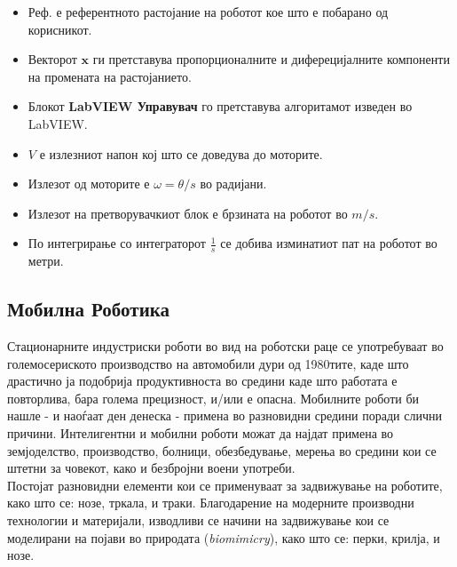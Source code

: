 \documentclass[12pt]{article}
\renewcommand{\vec}[1]{\mathbf{#1}}
\begin{document}
    \begin{itemize}
      \item Реф. е референтното растојание на роботот кое што е побарано од корисникот.
      \item Векторот $\vec{x}$ ги претставува пропорционалните и диферецијалните компоненти на промената на растојанието.
      \item Блокот \textbf{LabVIEW Управувач} го претставува алгоритамот изведен во LabVIEW.
      \item $V$ е излезниот напон кој што се доведува до моторите.
      \item Излезот од моторите е $\omega = \theta/s$ во радијани.
      \item Излезот на претворувачкиот блок е брзината на роботот во $m/s$.
      \item По интегрирање со интеграторот $\frac{1}{s}$ се добива изминатиот пат на роботот во метри.
    \end{itemize}

  \subsection{Мобилна Роботика}
    Стационарните индустриски роботи во вид на роботски раце се употребуваат во големосериското производство на автомобили дури од 1980тите, каде што драстично ја подобрија продуктивноста во средини каде што работата е повторлива, бара голема прецизност, и/или е опасна.
    \bigbreak
    Мобилните роботи би нашле - и наоѓаат ден денеска - примена во разновидни средини поради слични причини. Интелигентни и мобилни роботи можат да најдат примена во земјоделство, производство, болници, обезбедување, мерења во средини кои се штетни за човекот, како и безбројни воени употреби.
    \\ %
    Постојат разновидни елементи кои се применуваат за задвижување на роботите, како што се: нозе, тркала, и траки. Благодарение на модерните производни технологии и материјали, изводливи се начини на задвижување кои се моделирани на појави во природата (\textit{biomimicry}), како што се: перки, крилја, и нозе.
\end{document}
